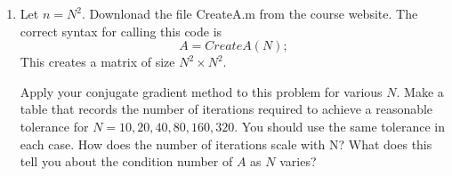 \documentclass[11pt, oneside]{article}
\begin{document}
\begin{enumerate}
    \begin{proof}
      Let $A$ be symmetric and positive definite and
      let $p_0, p_1, \ldots, p_l$ be A-conjugate, that is
      \[
        p_i^T A p_j = 0 \qquad \forall i \neq j.
      \]
      Consider a set of constants $c_0, c_1, \ldots, c_l$, such that
      \[
        \sum{i = 0}{l}{c_i p_i} = 0
      \]
      The set of vectors $\set{p_i}$ are linearly independent if $c_i = 0$ for
      all $i$.
      Consider the following
      \begin{align*}
        0 &= \sum{i = 0}{l}{c_i p_i^T} A \sum{j = 0}{l}{c_j p_j} \\
        0 &= \sum{i = 0}{l}{\sum{j = 0}{l}{c_i c_j  p_i^T A p_j}}
        \intertext{Since these vectors are A-conjugate}
        0 &= \sum{i = 0}{l}{c_i^2 p_i^T A p_i}.
        \intertext{Note that since $A$ is positive definite $p_i^T A p_i > 0$
          for all $i$, and since $c_i^2 \ge 0$ this implies that}
        0 &= c_i
      \end{align*}
      This shows that $p_0, p_1, \ldots, p_l$ are linearly independent.
      Therefore any set of A-conjugate vectors must also be linearly
      independent.
      Since a set of linearly independent vectors can be at most of size $n$,
      this implies that a set of A-conjugate vectors can be at most of size $n$.
    \end{proof}

  \item %
    Let $n = N^2$.
    Downlonad the \MATLAB file CreateA.m from the course website.
    The correct syntax for calling this code is
    \[
      A = CreateA(N);
    \]
    This creates a matrix of size $N^2 \times N^2$.

    Apply your conjugate gradient method to this problem for various $N$.
    Make a table that records the number of iterations required to achieve a
    reasonable tolerance for $N = 10, 20, 40, 80, 160, 320$.
    You should use the same tolerance in each case.
    How does the number of iterations scale with N?
    What does this tell you about the condition number of $A$ as $N$ varies?

    


\end{enumerate}
\end{document}
